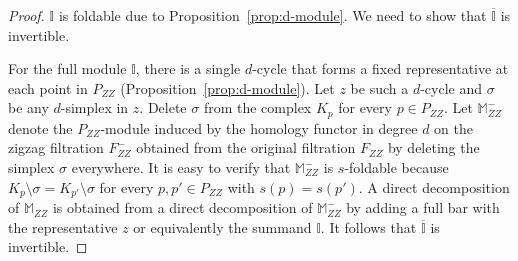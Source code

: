 \documentclass[11pt]{article}
\theoremstyle{plain}%
\newcommand{\Int}{\mathbb{I}}
\newcommand{\M}{\mathbb{M}}
\begin{document}
\begin{proof}
    $\Int$ is foldable due to Proposition~\ref{prop:d-module}. We need to show that $\overline{\Int}$ is invertible.

    For the full module $\Int$, there is a single $d$-cycle that forms a fixed representative at each point in $P_{ZZ}$ (Proposition~\ref{prop:d-module}). Let $z$ be such a $d$-cycle and $\sigma$ be any $d$-simplex in $z$. Delete $\sigma$ from the complex $K_p$ for every $p\in P_{ZZ}$. Let $\M_{ZZ}^-$ denote the $P_{ZZ}$-module induced by the homology functor in degree $d$ on the zigzag filtration $F_{ZZ}^-$ obtained from the original filtration $F_{ZZ}$ by deleting the simplex $\sigma$ everywhere. It is easy to verify that $\M_{ZZ}^-$ is $s$-foldable because $K_p\setminus \sigma=K_{p'}\setminus \sigma$ for every $p,p'\in P_{ZZ}$ with $s(p)=s(p')$. 
    A direct decomposition of $\M_{ZZ}$ is obtained from a direct decomposition of $\M_{ZZ}^-$ by adding a full bar with the representative $z$ or equivalently the summand $\Int$. It follows that $\overline{\Int}$ is invertible.
\end{proof}
\end{document}
